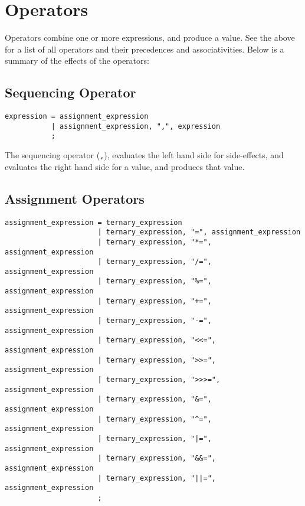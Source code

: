 \documentclass[letterpaper,12pt]{book}
\begin{document}
\section{Operators}

Operators combine one or more expressions, and produce a value. See the above for a list of all operators and their precedences and associativities. Below is a summary of the effects of the operators:

\subsection{Sequencing Operator}

\begin{lstlisting}[breaklines=true]
expression = assignment_expression
           | assignment_expression, ",", expression
           ;
\end{lstlisting}

The sequencing operator (\texttt{,}), evaluates the left hand side for side-effects, and evaluates the right hand side for a value, and produces that value.

\subsection{Assignment Operators}

\begin{lstlisting}[breaklines=true]
assignment_expression = ternary_expression
                      | ternary_expression, "=", assignment_expression
                      | ternary_expression, "*=", assignment_expression
                      | ternary_expression, "/=", assignment_expression
                      | ternary_expression, "%=", assignment_expression
                      | ternary_expression, "+=", assignment_expression
                      | ternary_expression, "-=", assignment_expression
                      | ternary_expression, "<<=", assignment_expression
                      | ternary_expression, ">>=", assignment_expression
                      | ternary_expression, ">>>=", assignment_expression
                      | ternary_expression, "&=", assignment_expression
                      | ternary_expression, "^=", assignment_expression
                      | ternary_expression, "|=", assignment_expression
                      | ternary_expression, "&&=", assignment_expression
                      | ternary_expression, "||=", assignment_expression
                      ;
\end{lstlisting}
\end{document}
